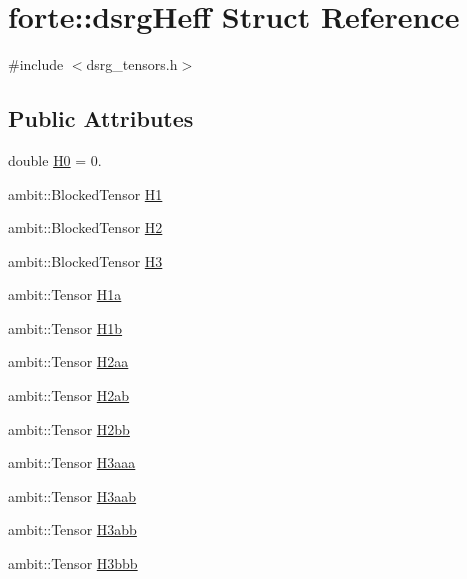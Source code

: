 \hypertarget{structforte_1_1dsrg_heff}{}\section{forte\+:\+:dsrg\+Heff Struct Reference}
\label{structforte_1_1dsrg_heff}


{\ttfamily \#include $<$dsrg\+\_\+tensors.\+h$>$}

\subsection*{Public Attributes}
\begin{DoxyCompactItemize}
\item 
double \mbox{\hyperlink{structforte_1_1dsrg_heff_a44bbed4e62f3c14e43fafba7d75cc588}{H0}} = 0.
\item 
ambit\+::\+Blocked\+Tensor \mbox{\hyperlink{structforte_1_1dsrg_heff_a4332211d17dfc7ad0bcb21693386d133}{H1}}
\item 
ambit\+::\+Blocked\+Tensor \mbox{\hyperlink{structforte_1_1dsrg_heff_ad179386f1081c02fedfa2ce484c70271}{H2}}
\item 
ambit\+::\+Blocked\+Tensor \mbox{\hyperlink{structforte_1_1dsrg_heff_a8373c6f1fcc3465e70a7579feca67f6d}{H3}}
\item 
ambit\+::\+Tensor \mbox{\hyperlink{structforte_1_1dsrg_heff_a4c342cea36648f90bb6827b6403874e4}{H1a}}
\item 
ambit\+::\+Tensor \mbox{\hyperlink{structforte_1_1dsrg_heff_a48aa1de8099c063eaba225c79d773414}{H1b}}
\item 
ambit\+::\+Tensor \mbox{\hyperlink{structforte_1_1dsrg_heff_a4304391ff2a9900df01bb010a6707fa2}{H2aa}}
\item 
ambit\+::\+Tensor \mbox{\hyperlink{structforte_1_1dsrg_heff_ac7a1a945ef716bbd761cdbfa01732070}{H2ab}}
\item 
ambit\+::\+Tensor \mbox{\hyperlink{structforte_1_1dsrg_heff_a4d908a83ae104fd897ca3a0c58b37525}{H2bb}}
\item 
ambit\+::\+Tensor \mbox{\hyperlink{structforte_1_1dsrg_heff_afe5bfca2143c7c61ddfcd442cf833a9f}{H3aaa}}
\item 
ambit\+::\+Tensor \mbox{\hyperlink{structforte_1_1dsrg_heff_a95e8985c98d780785ac076efbceed4d9}{H3aab}}
\item 
ambit\+::\+Tensor \mbox{\hyperlink{structforte_1_1dsrg_heff_a7050a0e428af5b6a80d58d43bdf3f8d5}{H3abb}}
\item 
ambit\+::\+Tensor \mbox{\hyperlink{structforte_1_1dsrg_heff_af611172ce3dba60d7a2c4473f8e0c995}{H3bbb}}
\end{DoxyCompactItemize}


